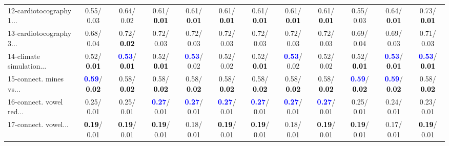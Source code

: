 \begin{table}[h]
\begin{center}
{\begin{tabular}{lc|c|c|c|c|c|c|c|c|c|c}
12-cardiotocography 1... &   0.55/  0.03 &   0.64/  0.02 &   0.61/\textcolor{black}{\textbf{  0.01}} &   0.61/\textcolor{black}{\textbf{  0.01}} &   0.61/\textcolor{black}{\textbf{  0.01}} &   0.61/\textcolor{black}{\textbf{  0.01}} &   0.61/\textcolor{black}{\textbf{  0.01}} &   0.61/\textcolor{black}{\textbf{  0.01}} &   0.55/  0.03 &   0.64/\textcolor{black}{\textbf{  0.01}} &   0.73/\textcolor{black}{\textbf{  0.01}} \\
13-cardiotocography 3... &   0.68/  0.04 &   0.72/\textcolor{black}{\textbf{  0.02}} &   0.72/  0.03 &   0.72/  0.03 &   0.72/  0.03 &   0.72/  0.03 &   0.72/  0.03 &   0.72/  0.03 &   0.69/  0.04 &   0.69/  0.03 &   0.71/  0.03 \\
14-climate simulation... &   0.52/\textcolor{black}{\textbf{  0.01}} & \textcolor{blue}{\textbf{  0.53}}/\textcolor{black}{\textbf{  0.01}} &   0.52/\textcolor{black}{\textbf{  0.01}} & \textcolor{blue}{\textbf{  0.53}}/  0.02 &   0.52/  0.02 &   0.52/\textcolor{black}{\textbf{  0.01}} & \textcolor{blue}{\textbf{  0.53}}/  0.02 &   0.52/  0.02 &   0.52/\textcolor{black}{\textbf{  0.01}} & \textcolor{blue}{\textbf{  0.53}}/\textcolor{black}{\textbf{  0.01}} & \textcolor{blue}{\textbf{  0.53}}/\textcolor{black}{\textbf{  0.01}} \\ \hline
15-connect. mines vs... & \textcolor{blue}{\textbf{  0.59}}/\textcolor{black}{\textbf{  0.02}} &   0.58/\textcolor{black}{\textbf{  0.02}} &   0.58/\textcolor{black}{\textbf{  0.02}} &   0.58/\textcolor{black}{\textbf{  0.02}} &   0.58/\textcolor{black}{\textbf{  0.02}} &   0.58/\textcolor{black}{\textbf{  0.02}} &   0.58/\textcolor{black}{\textbf{  0.02}} &   0.58/\textcolor{black}{\textbf{  0.02}} & \textcolor{blue}{\textbf{  0.59}}/\textcolor{black}{\textbf{  0.02}} & \textcolor{blue}{\textbf{  0.59}}/\textcolor{black}{\textbf{  0.02}} &   0.58/\textcolor{black}{\textbf{  0.02}} \\
16-connect. vowel red... &   0.25/  0.01 &   0.25/  0.01 & \textcolor{blue}{\textbf{  0.27}}/  0.01 & \textcolor{blue}{\textbf{  0.27}}/  0.01 & \textcolor{blue}{\textbf{  0.27}}/  0.01 & \textcolor{blue}{\textbf{  0.27}}/  0.01 & \textcolor{blue}{\textbf{  0.27}}/  0.01 & \textcolor{blue}{\textbf{  0.27}}/  0.01 &   0.25/  0.01 &   0.24/  0.01 &   0.23/  0.01 \\
17-connect. vowel... & \textcolor{black}{\textbf{  0.19}}/  0.01 & \textcolor{black}{\textbf{  0.19}}/  0.01 & \textcolor{black}{\textbf{  0.19}}/  0.01 &   0.18/  0.01 & \textcolor{black}{\textbf{  0.19}}/  0.01 & \textcolor{black}{\textbf{  0.19}}/  0.01 &   0.18/  0.01 & \textcolor{black}{\textbf{  0.19}}/  0.01 & \textcolor{black}{\textbf{  0.19}}/  0.01 &   0.17/  0.01 & \textcolor{black}{\textbf{  0.19}}/  0.01 \\

\end{tabular}}
\end{center}
\end{table}
